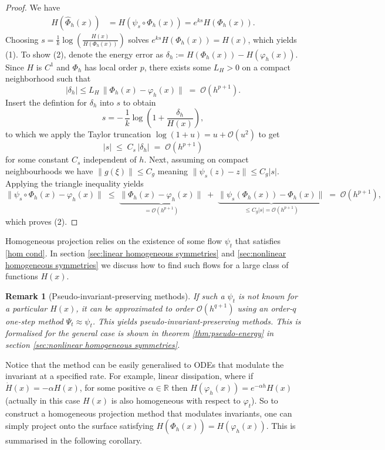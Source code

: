 \documentclass[final,3p,times]{elsarticle}
\newtheorem{remark}[theorem]{Remark}
\newcommand{\R}{\mathbb{R}}
\begin{document}
\begin{proof}
    We have
    \begin{align*}
        H(\widehat\Phi_{h}(x)) &= H(\psi_{s}\circ\Phi_h(x)) = e^{ks}H(\Phi_h(x)).
    \end{align*}
    Choosing $s = \frac{1}{k}\log\left(\frac{H(x)}{H(\Phi_h(x))}\right)$ solves $e^{ks}H(\Phi_h(x)) = H(x)$, which yields (1). To show (2), denote the energy error as $\delta_h :=  H(\Phi_h (x))-H(\varphi_h(x))$. Since $H$ is $C^1$ and $\Phi_h$ has local order $p$, there exists some $L_H>0$ on a compact neighborhood such that
    $$
      |\delta_h| \le L_H\,\|\Phi_h (x)-\varphi_h(x)\|\;=\;\mathcal{O}(h^{p+1}).
    $$
    Insert the defintion for $\delta_h $ into $s$ to obtain
    $$
      s = -\,\frac{1}{k}\log\!\left(1+\frac{\delta_h}{H(x)}\right),
    $$
    to which we apply the Taylor truncation  $\log(1+u)=u+\mathcal{O}(u^2)$ to get
    $$
      |s|\;\le\; C_s\,|\delta_h|\;=\;\mathcal{O}(h^{p+1})
    $$
    for some constant $C_s$ independent of $h$. Next, assuming on compact neighbourhoods we have $\|g(\xi)\|\le C_g$ meaning $\|\psi_s(z)-z\|\le C_g |s|$. Applying the triangle inequality yields
    $$
      \|\psi_s\circ\Phi_{h}(x)-\varphi_h(x)\|
      \;\le\; \underbrace{\|\Phi_h(x)-\varphi_h(x)\|}_{=\mathcal{O}(h^{p+1})}
      \;+\; \underbrace{\|\psi_{s}(\Phi_h(x))-\Phi_h(x)\|}_{\le C_g |s|=\mathcal{O}(h^{p+1})}
      \;=\;\mathcal{O}(h^{p+1}),
    $$
    which proves (2).
\end{proof}

Homogeneous projection relies on the existence of some flow $\psi_t$ that satisfies \eqref{hom cond}. In section \ref{sec:linear homogeneous symmetries} and \ref{sec:nonlinear homogeneous symmetries} we discuss how to find such flows for a large class of functions $H(x)$.

\begin{remark}[Pseudo-invariant-preserving methods]\label{rem:pseudo-energy}
   If such a $\psi_t$ is not known for a particular $H(x)$, it can be approximated to order $\mathcal{O}(h^{q+1})$ using an order-$q$ one-step method $\Psi_t\approx\psi_t$. This yields pseudo-invariant-preserving methods. This is formalised for the general case is shown in theorem \ref{thm:pseudo-energy} in section \ref{sec:nonlinear homogeneous symmetries}.
\end{remark}

Notice that the method can be easily generalised to ODEs that modulate the invariant at a specified rate. For example, linear dissipation, where if $\dot{H}(x)=-\alpha H(x)$, for some positive $\alpha\in\R$ then $H(\varphi_h(x))=e^{-\alpha h}H(x)$ (actually in this case $H(x)$ is also homogeneous with respect to $\varphi_t$). So to construct a homogeneous projection method that modulates invariants, one can simply project onto the surface satisfying $H(\widehat{\Phi}_h(x))=H(\varphi_h(x))$. This is summarised in the following corollary.
\end{document}
